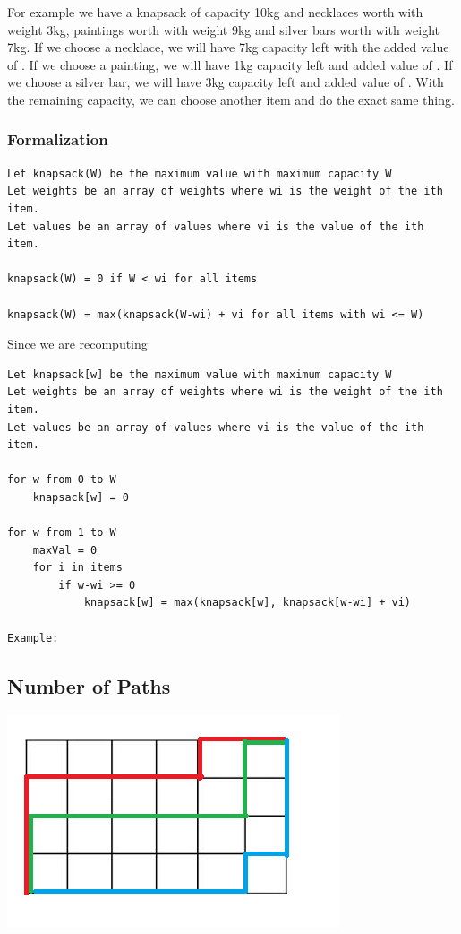 \documentclass[11pt,oneside]{book}
\makeatletter
\def\maxwidth#1{\ifdim\Gin@nat@width>#1 #1\else\Gin@nat@width\fi}
\makeatother
\begin{document}
For example we have a knapsack of capacity 10kg and necklaces worth  with weight 3kg, paintings worth  with weight 9kg and silver bars worth  with weight 7kg. If we choose a necklace, we will have 7kg capacity left with the added value of . If we choose a painting, we will have 1kg capacity left and added value of . If we choose a silver bar, we will have 3kg capacity left and added value of . With the remaining capacity, we can choose another item and do the exact same thing.

\subsubsection{Formalization}

\begin{lstlisting}
Let knapsack(W) be the maximum value with maximum capacity W
Let weights be an array of weights where wi is the weight of the ith item.
Let values be an array of values where vi is the value of the ith item.

knapsack(W) = 0 if W < wi for all items

knapsack(W) = max(knapsack(W-wi) + vi for all items with wi <= W)
\end{lstlisting}

Since we are recomputing

\begin{lstlisting}
Let knapsack[w] be the maximum value with maximum capacity W
Let weights be an array of weights where wi is the weight of the ith item.
Let values be an array of values where vi is the value of the ith item.

for w from 0 to W
    knapsack[w] = 0

for w from 1 to W
    maxVal = 0
    for i in items
        if w-wi >= 0
            knapsack[w] = max(knapsack[w], knapsack[w-wi] + vi)

Example:

\end{lstlisting}

\subsection{Number of Paths}

\includegraphics[width=\maxwidth{\textwidth}]{recursion_grid.png}
\end{document}
